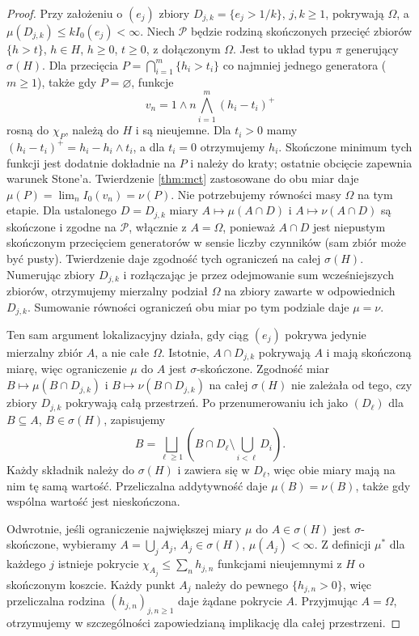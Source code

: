 \begin{proof}
Przy założeniu o $(e_j)$ zbiory
$D_{j,k}=\{e_j>1/k\}$, $j,k\ge1$, pokrywają $\Omega$,
a $\mu(D_{j,k})\le k I_0(e_j)<\infty$.
Niech $\mathcal P$ będzie rodziną skończonych przecięć
zbiorów $\{h>t\}$, $h\in H$, $h\ge0$, $t\ge0$,
z dołączonym $\Omega$. Jest to układ typu $\pi$
generujący $\sigma(H)$.
Dla przecięcia $P=\bigcap_{i=1}^m\{h_i>t_i\}$
co najmniej jednego generatora ($m\ge1$), także gdy
$P=\varnothing$, funkcje
\[
 v_n=1\wedge n\bigwedge_{i=1}^m(h_i-t_i)^+
\]
rosną do $\chi_P$, należą do $H$ i są nieujemne.
Dla $t_i>0$ mamy $(h_i-t_i)^+=h_i-h_i\wedge t_i$,
a dla $t_i=0$ otrzymujemy $h_i$. Skończone minimum
tych funkcji jest dodatnie dokładnie na $P$ i należy
do kraty; ostatnie obcięcie zapewnia warunek Stone'a.
Twierdzenie \ref{thm:mct} zastosowane do obu miar
daje $\mu(P)=\lim_n I_0(v_n)=\nu(P)$.
Nie potrzebujemy równości masy $\Omega$ na tym etapie.
Dla ustalonego $D=D_{j,k}$ miary
$A\mapsto\mu(A\cap D)$ i $A\mapsto\nu(A\cap D)$
są skończone i zgodne na $\mathcal P$, włącznie
z $A=\Omega$, ponieważ $A\cap D$ jest niepustym
skończonym przecięciem generatorów w sensie liczby
czynników (sam zbiór może być pusty).
Twierdzenie
daje zgodność tych ograniczeń na całej $\sigma(H)$.
Numerując zbiory $D_{j,k}$ i rozłączając je przez
odejmowanie sum wcześniejszych zbiorów, otrzymujemy
mierzalny podział $\Omega$ na zbiory zawarte
w odpowiednich $D_{j,k}$. Sumowanie równości
ograniczeń obu miar po tym podziale daje
$\mu=\nu$.

Ten sam argument lokalizacyjny działa, gdy ciąg
$(e_j)$ pokrywa jedynie mierzalny zbiór $A$, a nie
całe $\Omega$. Istotnie, $A\cap D_{j,k}$ pokrywają
$A$ i mają skończoną miarę, więc ograniczenie $\mu$
do $A$ jest $\sigma$-skończone. Zgodność miar
$B\mapsto\mu(B\cap D_{j,k})$ i
$B\mapsto\nu(B\cap D_{j,k})$ na całej $\sigma(H)$
nie zależała od tego, czy zbiory $D_{j,k}$ pokrywają
całą przestrzeń. Po przenumerowaniu ich jako $(D_\ell)$
dla $B\subseteq A$, $B\in\sigma(H)$, zapisujemy
\[
 B=\bigsqcup_{\ell\ge1}
 \left(B\cap D_\ell\setminus\bigcup_{i<\ell}D_i\right).
\]
Każdy składnik należy do $\sigma(H)$ i zawiera się
w $D_\ell$, więc obie miary mają na nim tę samą
wartość. Przeliczalna addytywność daje $\mu(B)=\nu(B)$,
także gdy wspólna wartość jest nieskończona.

Odwrotnie, jeśli ograniczenie największej miary
$\mu$ do $A\in\sigma(H)$ jest $\sigma$-skończone,
wybieramy $A=\bigcup_j A_j$, $A_j\in\sigma(H)$,
$\mu(A_j)<\infty$. Z definicji $\mu^*$ dla każdego
$j$ istnieje pokrycie $\chi_{A_j}\le\sum_n h_{j,n}$
funkcjami nieujemnymi z $H$ o skończonym koszcie.
Każdy punkt $A_j$ należy do pewnego
$\{h_{j,n}>0\}$, więc przeliczalna rodzina
$(h_{j,n})_{j,n\ge1}$ daje żądane pokrycie $A$.
Przyjmując $A=\Omega$, otrzymujemy w szczególności
zapowiedzianą implikację dla całej przestrzeni.
\end{proof}

